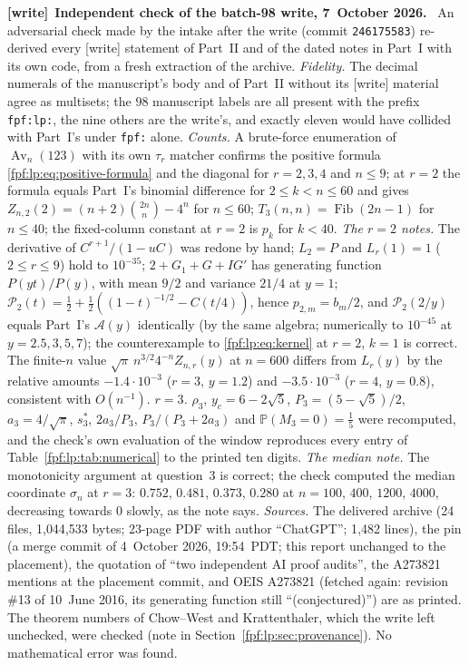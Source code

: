 \documentclass[11pt]{article}
\numberwithin{equation}{section}
\theoremstyle{definition}
\newcommand{\Av}{\operatorname{Av}}
\newcommand{\Prob}{\mathbb P}
\newenvironment{writenote}[1][]{\par\smallskip\begingroup\small
 \noindent\textbf{[write]}\if\relax\detokenize{#1}\relax\else~\textbf{#1.}\fi\ }%
 {\par\endgroup\smallskip}
\begin{document}
\begin{writenote}[Independent check of the batch-98 write, 7~October 2026]
An adversarial check made by the intake after the write (commit
\texttt{246175583}) re-derived every \textsf{[write]} statement of Part~II
and of the dated notes in Part~I with its own code, from a fresh extraction
of the archive. \emph{Fidelity.} The decimal numerals of the manuscript's
body and of Part~II without its \textsf{[write]} material agree as
multisets; the $98$ manuscript labels are all present with the prefix
\texttt{fpf:lp:}, the nine others are the write's, and exactly eleven would
have collided with Part~I's under \texttt{fpf:} alone. \emph{Counts.} A
brute-force enumeration of $\Av_n(123)$ with its own $\tau_r$ matcher
confirms the positive formula \eqref{fpf:lp:eq:positive-formula} and the
diagonal for $r=2,3,4$ and $n\le9$; at $r=2$ the formula equals Part~I's
binomial difference for $2\le k<n\le60$ and gives
$Z_{n,2}(2)=(n+2)\binom{2n}n-4^n$ for $n\le60$; $T_3(n,n)=\operatorname{Fib}(2n-1)$
for $n\le40$; the fixed-column constant at $r=2$ is $p_k$ for $k<40$.
\emph{The $r=2$ notes.} The derivative of $C^{r+1}/(1-uC)$ was redone by
hand; $L_2=P$ and $L_r(1)=1$ ($2\le r\le9$) hold to $10^{-35}$;
$2+G_1+G+IG'$ has generating function $P(yt)/P(y)$, with mean $9/2$ and
variance $21/4$ at $y=1$; $\mathcal P_2(t)=\frac12+\frac12((1-t)^{-1/2}-C(t/4))$,
hence $p_{2,m}=b_m/2$, and $\mathcal P_2(2/y)$ equals Part~I's
$\mathcal A(y)$ identically (by the same algebra; numerically to $10^{-45}$
at $y=2.5,3,5,7$); the counterexample to \eqref{fpf:lp:eq:kernel} at $r=2$,
$k=1$ is correct. The finite-$n$ value
$\sqrt\pi\,n^{3/2}4^{-n}Z_{n,r}(y)$ at $n=600$ differs from $L_r(y)$ by the
relative amounts $-1.4\cdot10^{-3}$ ($r=3$, $y=1.2$) and $-3.5\cdot10^{-3}$
($r=4$, $y=0.8$), consistent with $O(n^{-1})$. \emph{$r=3$.} $\rho_3$,
$y_c=6-2\sqrt5$, $P_3=(5-\sqrt5)/2$, $a_3=4/\sqrt\pi$, $s_3^*$, $2a_3/P_3$,
$P_3/(P_3+2a_3)$ and $\Prob(M_3=0)=\frac15$ were recomputed, and the
check's own evaluation of the window reproduces every entry of
Table~\ref{fpf:lp:tab:numerical} to the printed ten digits. \emph{The
median note.} The monotonicity argument at question~3 is correct; the
check computed the median coordinate $\sigma_n$ at $r=3$: $0.752$, $0.481$,
$0.373$, $0.280$ at $n=100$, $400$, $1200$, $4000$, decreasing towards
$0$ slowly, as the note says. \emph{Sources.} The delivered archive (24
files, 1{,}044{,}533 bytes; 23-page PDF with author ``ChatGPT''; 1{,}482
lines), the pin (a merge commit of 4~October 2026, 19:54~PDT; this
report unchanged to the placement), the quotation of ``two independent AI
proof audits'', the A273821 mentions at the placement commit, and OEIS
A273821 (fetched again: revision \#13 of 10~June 2016, its generating
function still ``(conjectured)'') are as printed. The theorem numbers of
Chow--West and Krattenthaler, which the write left unchecked, were checked
(note in Section~\ref{fpf:lp:sec:provenance}). No mathematical error was
found.
\end{writenote}
\end{document}
